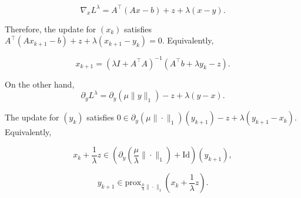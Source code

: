 \begin{enumerate}
        $$\nabla_x L^\lambda = A^\top(Ax - b) + z + \lambda(x-y).$$

        Therefore, the update for $(x_k)$ satisfies $A^\top(Ax_{k+1} - b) + z + \lambda(x_{k+1}-y_{k}) = 0$. Equivalently,

        $$x_{k+1} = (\lambda I + A^\top A)^{-1}(A^\top b + \lambda y_k - z).$$

        On the other hand,
        $$\partial_y L^\lambda = \partial_{y}(\mu\|y\|_1) - z + \lambda(y-x).$$

        The update for $(y_k)$ satisfies $0 \in \partial_{y}(\mu\|\cdot\|_1)(y_{k+1}) - z + \lambda(y_{k+1} - x_k)$. Equivalently,

        $$x_k + \dfrac{1}{\lambda}z \in \left(\partial_{y}\left(\dfrac{\mu}{\lambda}\|\cdot\|_1\right) + \mathrm{Id}\right)(y_{k+1}),$$

        $$y_{k+1} \in \mathrm{prox}_{\frac{\mu}{\lambda}\|\cdot\|_1}\left(x_k + \dfrac{1}{\lambda}z\right).$$

\end{enumerate}